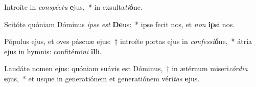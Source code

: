 \item Introíte in \textit{con}\textit{spéc}\textit{tu} \textbf{e}jus,~* in exsulta\textit{ti}\textbf{ó}ne.
\item Scitóte quóniam Dóminus \textit{ip}\textit{se} \textit{est} \textbf{De}us:~* ipse fecit nos, et \textit{non} \textbf{ip}si nos.
\item Pópulus ejus, et oves páscuæ ejus:~† introíte portas ejus in \textit{con}\textit{fes}\textit{si}\textbf{ó}ne,~* átria ejus in hymnis: confitémi\textit{ni} \textbf{il}li.
\item Laudáte nomen ejus: quóniam suávis est Dóminus,~† in ætérnum miseri\textit{cór}\textit{di}\textit{a} \textbf{e}jus,~* et usque in generatiónem et generatiónem véri\textit{tas} \textbf{e}jus.
